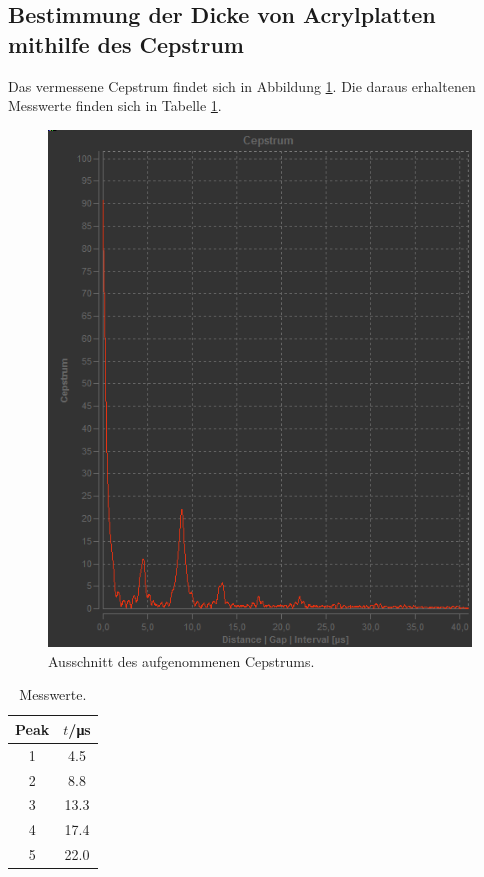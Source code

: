 \documentclass[
  bibliography=totoc,     %
  captions=tableheading,  %
  titlepage=firstiscover, %
]{scrartcl}
\begin{document}
\subsection{Bestimmung der Dicke von Acrylplatten mithilfe des Cepstrum}
Das vermessene Cepstrum findet sich in Abbildung \ref{abb:5}. Die daraus erhaltenen
Messwerte finden sich in Tabelle \ref{tab:5}.
\begin{figure}
  \centering
  \includegraphics[width=\textwidth]{mehrfachrefl.png}
  \caption{Ausschnitt des aufgenommenen Cepstrums.}
  \label{abb:5}
\end{figure}
\begin{table}
  \centering
  \begin{tabular}{c c }
    \toprule
    Peak & $t$/\si{\micro\second} \\
    \midrule
    1 & 4.5\\
    2 & 8.8\\
    3 & 13.3\\
    4 & 17.4\\
    5 & 22.0\\
    \bottomrule
  \end{tabular}
  \caption{Messwerte.}
  \label{tab:5}
\end{table}
\end{document}
